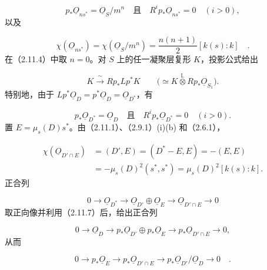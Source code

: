 \begin{equation}\tag{2.11.5}
p_*\underline{O}_{ns^*}=\underline{O}_S/m^n
\quad\text{且}\quad
R^ip_*\underline{O}_{ns^*}=0\quad(i>0),
\end{equation}
以及

\begin{equation}\tag{2.11.6}
\chi(\underline{O}_{ns^*})
=\chi(\underline{O}_S/m^n)
=\frac{n(n+1)}2[k(s):k] \quad .
\end{equation}
在（2.11.4）中取 $n=0$。对 $S$ 上的任一凝聚层复形 $K$，投影公式给出

\begin{equation*}
K\xrightarrow{\;\sim\;}Rp_*Lp^*K
\qquad
\bigl(\simeq K\overset{\mathbb L}{\otimes}Rp_*\underline{O}_{S_1}\bigr).
\end{equation*}
特别地，由于 $Lp^*\underline{O}_D=p^*\underline{O}_D=\underline{O}_{D^*}$，有

\begin{equation}\tag{2.11.7}
p_*\underline{O}_{D^*}=\underline{O}_D
\quad\text{且}\quad
R^ip_*\underline{O}_{D^*}=0\quad(i>0).
\end{equation}
置 $E=\mu_s(D)s^*$。由（2.11.1）、（2.9.1）(i)(b) 和（2.6.1），

\begin{equation}\tag{2.11.8}
\begin{aligned}
\chi(\underline{O}_{D'\cap E})
&=(D',E)=(D^*-E,E)=-(E,E)\\
&=-\mu_s(D)^2(s^*,s^*)
=\mu_s(D)^2[k(s):k].
\end{aligned}
\end{equation}
正合列

\begin{equation*}
0\longrightarrow\underline{O}_{D^*}
\longrightarrow\underline{O}_{D'}\oplus\underline{O}_E
\longrightarrow\underline{O}_{D'\cap E}
\longrightarrow0
\end{equation*}
取正向像并利用（2.11.7）后，给出正合列

\begin{equation*}
0\longrightarrow\underline{O}_D
\longrightarrow p_*\underline{O}_{D'}\oplus p_*\underline{O}_E
\longrightarrow p_*\underline{O}_{D'\cap E}
\longrightarrow0,
\end{equation*}
从而

\begin{equation*}
0\longrightarrow p_*\underline{O}_E
\longrightarrow p_*\underline{O}_{D'\cap E}
\longrightarrow p_*\underline{O}_{D'}/\underline{O}_D
\longrightarrow0 \quad .
\end{equation*}

